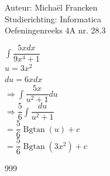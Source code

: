 \documentclass[a4paper]{article}
\newcommand{\dint}{\displaystyle\int}
\begin{document}
\noindent \large Auteur: Michaël Francken \\
\noindent \large Studierichting: Informatica\\
\noindent \large Oefeningenreeks 4A nr. 28.3\\

\medskip

\normalsize

$\dint\dfrac{5xdx}{9x^4+1}$\\

$u = 3x^2$\\

$du = 6xdx$\\


$\Rightarrow \dint\dfrac{5x}{u^2+1}du$\\

$\Rightarrow \dfrac{5}{6}\dint\dfrac{du}{u^2+1}$\\

$=\dfrac{5}{6}\operatorname{Bgtan}(u) +c$\\

$=\dfrac{5}{6}\operatorname{Bgtan}(3x^2) +c$\\


\begin{thebibliography}{999}
\end{thebibliography}
\end{document}
